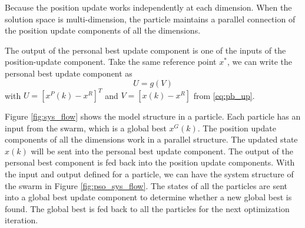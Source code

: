 Because the position update works independently at each dimension.
When the solution space is multi-dimension, the particle maintains a parallel connection of the position update components of all the dimensions.

The output of the personal best update component is one of the inputs of the position-update component.
Take the same reference point $ x^{*} $, we can write the personal best update component as 
\begin{equation}
\label{eq:pso_input_up}
U = g(V)
\end{equation}
with $ U = [ x^{P}(k) - x^{R} ]^{T} $ 
and $ V = [ x(k) - x^{R} ] $
from \eqref{eq:pb_up}. 

Figure \ref{fig:sys_flow} shows the model structure in a particle.
Each particle has an input from the swarm, which is a global best $ x^{G} (k) $.
The position update components of all the dimensions work in a parallel structure.
The updated state $ x (k) $ will be sent into the personal best update component.
The output of the personal best component is fed back into the position update components.
With the input and output defined for a particle, we can have the system structure of the swarm in Figure \ref{fig:pso_sys_flow}.
The states of all the particles are sent into a global best update component to determine whether a new global best is found.
The global best is fed back to all the particles for the next optimization iteration.

